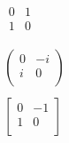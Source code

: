 \documentclass[12pt,a5paper]{book}
\begin{document}
\begin{align*}
\begin{matrix}
0 & 1 \\
1 & 0\\
\end{matrix}
\\~\\
\begin{pmatrix}
0 & -i \\
i & 0\\
\end{pmatrix}
\\~\\
\begin{bmatrix}
0 & -1 \\
1 & 0\\
\end{bmatrix}
\end{align*}
\end{document}
